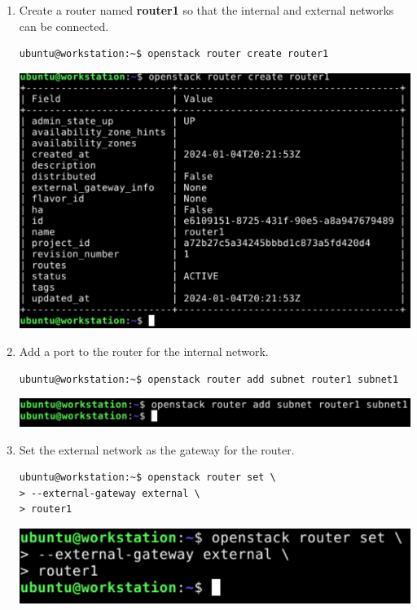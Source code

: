 \documentclass[letterpaper, 12pt]{article}
\begin{document}
\begin{enumerate}
    \item Create a router named \textbf{router1} so that the internal and external networks can be connected.
\begin{lstlisting}
ubuntu@workstation:~$ openstack router create router1
\end{lstlisting}

    \begin{center}
        \includegraphics[width=\linewidth]{images/part1/step22.png}
    \end{center}

    \item Add a port to the router for the internal network.
\begin{lstlisting}
ubuntu@workstation:~$ openstack router add subnet router1 subnet1
\end{lstlisting}

    \begin{center}
        \includegraphics[width=\linewidth]{images/part1/step23.png}
    \end{center}

    \item Set the external network as the gateway for the router.
\begin{lstlisting}
ubuntu@workstation:~$ openstack router set \
> --external-gateway external \
> router1
\end{lstlisting}

    \begin{center}
        \includegraphics[width=\linewidth]{images/part1/step24.png}
    \end{center}


\end{enumerate}
\end{document}
